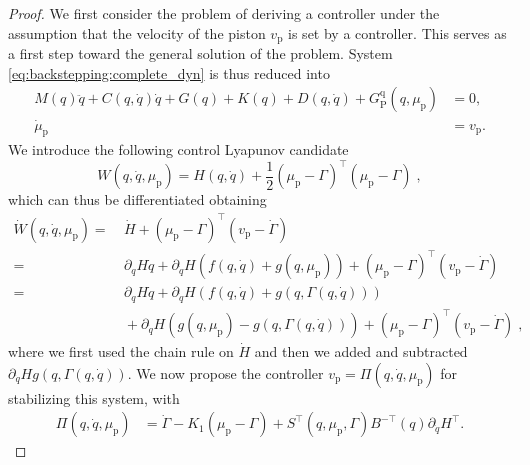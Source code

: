 \begin{proof}
	
	We first consider the problem of deriving a controller under the assumption that the velocity of the piston $v_\mathrm{p}$ is set by a controller. This serves as a first step toward the general solution of the problem. System \eqref{eq:backstepping:complete_dyn} is thus reduced into
	\begin{equation}\label{eq:backstepping:intermediate}
	\begin{split}
	M(q)\ddot{q} \! + \! C(q,\dot{q})\dot{q} \! + \! G(q) \! + \! K(q) \! + \! D(q,\dot{q}) \! + \! G_{\mathrm{P}}^{\mathrm{q}}(q,\mu_\mathrm{p}) &= 0, \\
	\dot{\mu}_\mathrm{p} &= v_\mathrm{p}. 
	\end{split}
	\end{equation}
	We introduce the following control Lyapunov candidate
	\begin{equation}
		W(q,\dot{q},\mu_\mathrm{p}) = H(q,\dot{q}) + \frac{1}{2}(\mu_\mathrm{p} - \Gamma)^{\top}(\mu_\mathrm{p} - \Gamma)\;,
	\end{equation}
	which can thus be differentiated obtaining
	\begin{equation}
		\begin{split}
			\dot{W}(q,\dot{q},\mu_\mathrm{p}) =& \: \dot{H} + (\mu_\mathrm{p} - \Gamma)^{\top}(v_\mathrm{p} - \dot\Gamma)\\
			=&  \: \partial_{q} H \dot{q} + \partial_{\dot{q}} H (f(q,\dot{q}) + g(q,\mu_\mathrm{p})) + (\mu_\mathrm{p} - \Gamma)^{\top}(v_\mathrm{p} - \dot\Gamma) \\
			=& \: \partial_{q} H \dot{q} + \partial_{\dot{q}} H (f(q,\dot{q}) + g(q,\Gamma(q,\dot{q}))) \\
			& \: + \partial_{\dot{q}} H (g(q,\mu_\mathrm{p}) - g(q,\Gamma(q,\dot{q}))) + (\mu_\mathrm{p} - \Gamma)^{\top} (v_\mathrm{p} - \dot\Gamma)\;,
		\end{split}
	\end{equation}
	where we first used the chain rule on $\dot{H}$ and then we added and subtracted $\partial_{\dot{q}} H g(q,\Gamma(q,\dot{q}))$.
	We now propose the controller $v_\mathrm{p} = \Pi(q,\dot{q},\mu_\mathrm{p})$ for stabilizing this system, with
	\begin{equation*}
		\begin{split}
			\Pi(q,\dot{q},\mu_\mathrm{p}) &= \dot{\Gamma} - K_1 (\mu_\mathrm{p} - \Gamma) + S^{\top}(q,\mu_\mathrm{p},\Gamma)B^{-\top}(q)\partial_{\dot{q}} H^{\top}.
		\end{split}

\end{equation*}
\end{proof}
